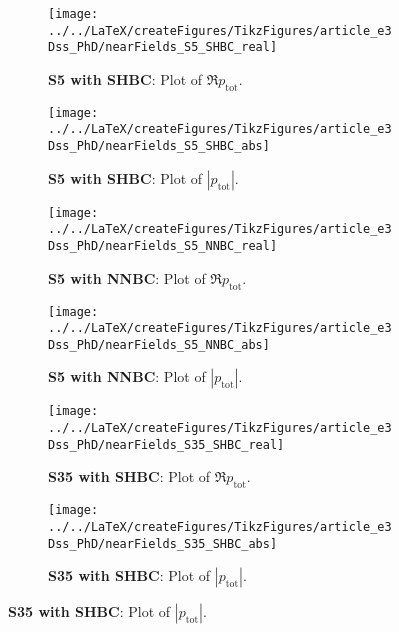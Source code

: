 \begin{figure}
	\centering
	\begin{subfigure}[t]{0.49\textwidth}
		\centering
		\texttt{[image: ../../LaTeX/createFigures/TikzFigures/article\_e3Dss\_PhD/nearFields\_S5\_SHBC\_real]}
		\caption{\textbf{S5 with SHBC}: Plot of $\Re p_{\mathrm{tot}}$.}
		\label{Fig1:S5_SHBC_real}
	\end{subfigure}%
	\hspace*{0.02\textwidth}%
	\begin{subfigure}[t]{0.49\textwidth}
		\centering
		\texttt{[image: ../../LaTeX/createFigures/TikzFigures/article\_e3Dss\_PhD/nearFields\_S5\_SHBC\_abs]}
		\caption{\textbf{S5 with SHBC}: Plot of $|p_{\mathrm{tot}}|$.}
		\label{Fig1:S5_SHBC_abs}
	\end{subfigure}%
	\par\bigskip
	\begin{subfigure}[t]{0.49\textwidth}
		\centering
		\texttt{[image: ../../LaTeX/createFigures/TikzFigures/article\_e3Dss\_PhD/nearFields\_S5\_NNBC\_real]}
		\caption{\textbf{S5 with NNBC}: Plot of $\Re p_{\mathrm{tot}}$.}
		\label{Fig1:S5_NNBC_real}
	\end{subfigure}%
	\hspace*{0.02\textwidth}%
	\begin{subfigure}[t]{0.49\textwidth}
		\centering
		\texttt{[image: ../../LaTeX/createFigures/TikzFigures/article\_e3Dss\_PhD/nearFields\_S5\_NNBC\_abs]}
		\caption{\textbf{S5 with NNBC}: Plot of $|p_{\mathrm{tot}}|$.}
		\label{Fig1:S5_NNBC_abs}
	\end{subfigure}%
	\par\bigskip
	\begin{subfigure}[t]{0.49\textwidth}
		\centering
		\texttt{[image: ../../LaTeX/createFigures/TikzFigures/article\_e3Dss\_PhD/nearFields\_S35\_SHBC\_real]}
		\caption{\textbf{S35 with SHBC}: Plot of $\Re p_{\mathrm{tot}}$.}
		\label{Fig1:S35_SHBC_real}
	\end{subfigure}%
	\hspace*{0.02\textwidth}%
	\begin{subfigure}[t]{0.49\textwidth}
		\centering
		\texttt{[image: ../../LaTeX/createFigures/TikzFigures/article\_e3Dss\_PhD/nearFields\_S35\_SHBC\_abs]}
		\caption{\textbf{S35 with SHBC}: Plot of $|p_{\mathrm{tot}}|$.}

\end{subfigure}
\end{figure}
